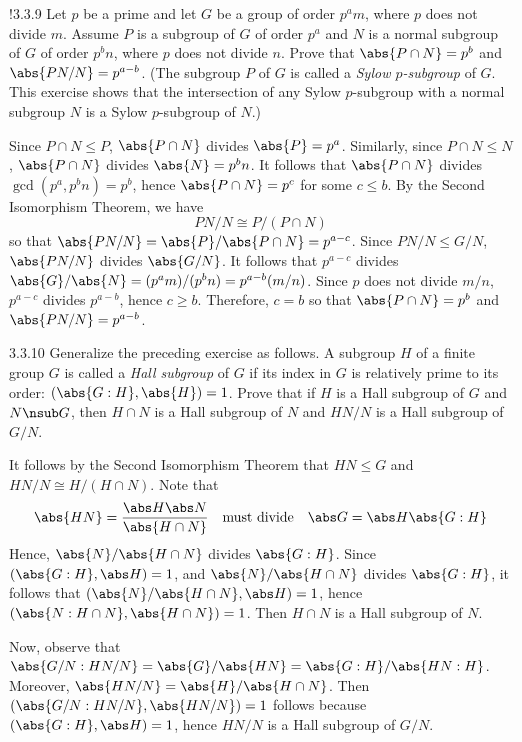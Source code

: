 \begin{exercise}!{3.3.9}
    Let $p$ be a prime and let $G$ be a group of order $p^am$, where $p$ does not divide $m$.
	Assume $P$ is a subgroup of $G$ of order $p^a$ and $N$ is a normal subgroup of $G$ of order $p^b n$, where $p$ does not divide $n$.
	Prove that $\abs{P \cap N} = p^b$ and $\abs{PN/N} = p^{a - b}$. (The subgroup $P$ of $G$ is called a \emph{Sylow $p$-subgroup} of $G$.
	This exercise shows that the intersection of any Sylow $p$-subgroup with a normal subgroup $N$ is a Sylow $p$-subgroup of $N$.)
\end{exercise}

\begin{sol}
    Since $P \cap N \leq P$, $\abs{P \cap N}$ divides $\abs{P} = p^a$.
	Similarly, since $P \cap N \leq N$, $\abs{P \cap N}$ divides $\abs{N} = p^b n$.
	It follows that $\abs{P \cap N}$ divides $\gcd(p^a, p^b n) = p^b$, hence $\abs{P \cap N} = p^c$ for some $c \leq b$.
	By the Second Isomorphism Theorem, we have
    \[
    	PN/N \cong P/(P \cap N)
    \]
    so that $\abs{PN/N} = \abs{P}/\abs{P \cap N} = p^{a - c}$.
	Since $PN/N \leq G/N$, $\abs{PN/N}$ divides $\abs{G/N}$.
	It follows that $p^{a - c}$ divides $\abs{G}/\abs{N} = (p^a m)/(p^b n) = p^{a - b}(m/n)$.
	Since $p$ does not divide $m/n$, $p^{a - c}$ divides $p^{a - b}$, hence $c \geq b$.
	Therefore, $c = b$ so that $\abs{P \cap N} = p^b$ and $\abs{PN/N} = p^{a - b}$.
\end{sol}

\begin{exercise}{3.3.10}
    Generalize the preceding exercise as follows.
	A subgroup $H$ of a finite group $G$ is called a \emph{Hall subgroup} of $G$ if its index in $G$ is relatively prime to its order: $(\abs{G : H}, \abs{H}) = 1$.
	Prove that if $H$ is a Hall subgroup of $G$ and $N \nsub G$, then $H \cap N$ is a Hall subgroup of $N$ and $HN/N$ is a Hall subgroup of $G/N$.
\end{exercise}

\begin{sol}
    It follows by the Second Isomorphism Theorem that $HN \leq G$ and $HN/N \cong H/(H \cap N)$.
	Note that
    \[
    	\abs{HN} = \frac{\abs H \abs N}{\abs{H \cap N}} \quad \text{must divide} \quad \abs G = \abs H \abs{G : H}
    \]
    Hence, $\abs{N}/\abs{H \cap N}$ divides $\abs{G : H}$.
	Since $(\abs{G : H}, \abs H) = 1$, and $\abs{N}/\abs{H \cap N}$ divides $\abs{G : H}$, it follows that $(\abs{N}/\abs{H \cap N}, \abs H) = 1$, hence $(\abs{N : H \cap N}, \abs{H \cap N}) = 1$.
	Then $H \cap N$ is a Hall subgroup of $N$.

    Now, observe that $\abs{G/N : HN/N} = \abs{G}/\abs{HN} = \abs{G:H}/\abs{HN : H}$.
	Moreover, $\abs{HN/N} = \abs{H}/\abs{H \cap N}$.
	Then $(\abs{G/N : HN/N}, \abs{HN/N}) = 1$ follows because $(\abs{G : H}, \abs H) = 1$, hence $HN/N$ is a Hall subgroup of $G/N$.
\end{sol}